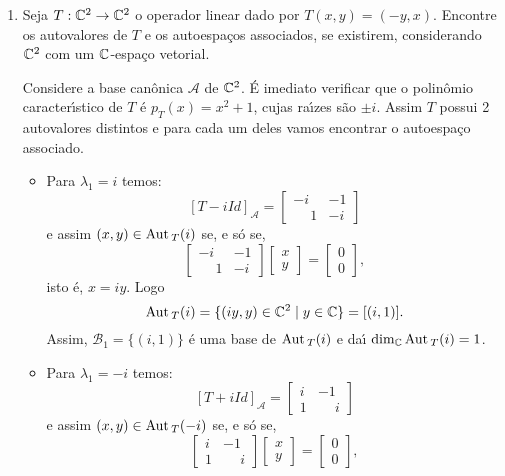 \begin{exemplo}
\begin{enumerate}[label={\arabic*})]
\begin{solucao}
            Nesse caso, não existe $\lambda \in \real$ tal que $\lambda^2 + 1 = 0$. Logo $T$ não é diagonalizável.
        \end{solucao}
        \item Seja $T : \mathbb{C}^2 \to \mathbb{C}^2$ o operador linear dado por $T(x,y) = (-y,x)$. Encontre os autovalores de $T$ e os autoespa\c{c}os associados, se existirem, considerando $\mathbb{C}^2$ com um $\mathbb{C}$-espa\c{c}o vetorial.
        \begin{solucao}
            Considere a base can\^onica $\mathcal{A}$ de $\mathbb{C}^2$. \'E imediato verificar que o polin\^omio caracter{\'\i}stico de $T$ \'e $p_T(x) = x^2 + 1$, cujas ra{\'\i}zes s\~ao $\pm i$. Assim $T$ possui 2 autovalores distintos e para cada um deles vamos encontrar o autoespa\c{c}o associado.
            \begin{itemize}
                \item Para $\lambda_1 = i$ temos:
                \[
                    [T - iId]_\mathcal{A} = \begin{bmatrix} -i & -1\\\phantom{-}1 & -i\end{bmatrix}
                \]
                e assim $(x,y) \in {\rm Aut\,}_T(i)$ se, e s\'o se,
                \[
                    \begin{bmatrix} -i & -1\\\phantom{-}1 & -i\end{bmatrix} \begin{bmatrix} x\\y\end{bmatrix}     = \begin{bmatrix} 0\\0\end{bmatrix},
                \]
                isto \'e, $x = iy$. Logo
                \[
                    {\rm Aut\,}_T(i) = \{(iy,y) \in \mathbb{C}^2 \mid y \in \mathbb{C}\} = [(i,1)].
                \]
                Assim, $\mathcal{B}_1 = \{(i,1)\}$ \'e uma base de ${\rm Aut\,}_T(i)$ e da{\'\i} $\dim_{\mathbb{C}}{\rm Aut\,}_T(i) = 1$.
                \item Para $\lambda_1 = -i$ temos:
                \[
                    [T + iId]_\mathcal{A} = \begin{bmatrix} i & -1\\1 & \phantom{-}i\end{bmatrix}
                \]
                e assim $(x,y) \in {\rm Aut\,}_T(-i)$ se, e s\'o se,
                \[
                    \begin{bmatrix} i & -1\\1 & \phantom{-}i\end{bmatrix} \begin{bmatrix} x\\y\end{bmatrix}     = \begin{bmatrix} 0\\0\end{bmatrix},
\]
\end{itemize}
\end{solucao}
\end{enumerate}
\end{exemplo}
